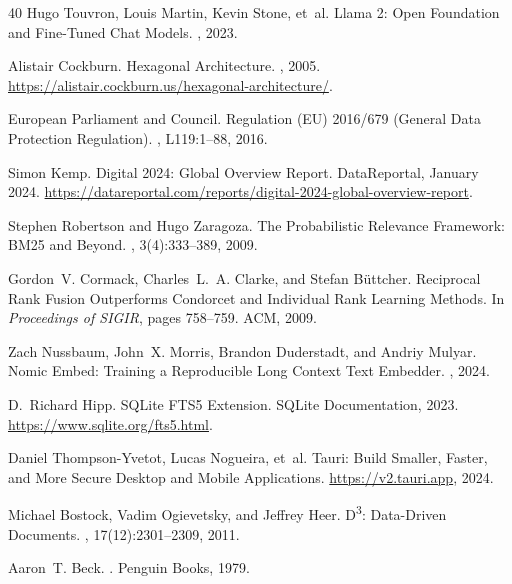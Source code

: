 \documentclass[manuscript,review]{acmart}
\begin{document}
\begin{thebibliography}{40}
Hugo Touvron, Louis Martin, Kevin Stone, et~al.
\newblock Llama 2: Open Foundation and Fine-Tuned Chat Models.
, 2023.

Alistair Cockburn.
\newblock Hexagonal Architecture.
, 2005.
\newblock \url{https://alistair.cockburn.us/hexagonal-architecture/}.

{European Parliament and Council}.
\newblock Regulation (EU) 2016/679 (General Data Protection Regulation).
, L119:1--88, 2016.

Simon Kemp.
\newblock Digital 2024: Global Overview Report.
\newblock DataReportal, January 2024.
\newblock \url{https://datareportal.com/reports/digital-2024-global-overview-report}.

Stephen Robertson and Hugo Zaragoza.
\newblock The Probabilistic Relevance Framework: BM25 and Beyond.
, 3(4):333--389, 2009.

Gordon~V. Cormack, Charles~L.~A. Clarke, and Stefan B{\"u}ttcher.
\newblock Reciprocal Rank Fusion Outperforms Condorcet and Individual Rank Learning Methods.
\newblock In {\em Proceedings of SIGIR}, pages 758--759. ACM, 2009.

Zach Nussbaum, John~X. Morris, Brandon Duderstadt, and Andriy Mulyar.
\newblock Nomic Embed: Training a Reproducible Long Context Text Embedder.
, 2024.

D.~Richard Hipp.
\newblock SQLite FTS5 Extension.
\newblock SQLite Documentation, 2023.
\newblock \url{https://www.sqlite.org/fts5.html}.

Daniel Thompson-Yvetot, Lucas Nogueira, et~al.
\newblock Tauri: Build Smaller, Faster, and More Secure Desktop and Mobile Applications.
\newblock \url{https://v2.tauri.app}, 2024.

Michael Bostock, Vadim Ogievetsky, and Jeffrey Heer.
\newblock D\textsuperscript{3}: Data-Driven Documents.
, 17(12):2301--2309, 2011.

Aaron~T. Beck.
.
\newblock Penguin Books, 1979.


\end{thebibliography}
\end{document}

